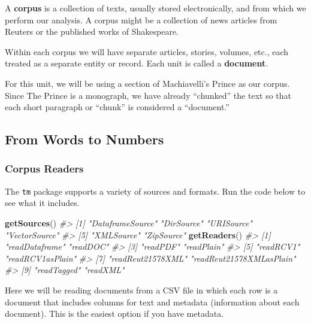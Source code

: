 \documentclass[]{book}
\newenvironment{Shaded}{\begin{snugshade}}{\end{snugshade}}
\newcommand{\KeywordTok}[1]{\textcolor[rgb]{0.13,0.29,0.53}{\textbf{#1}}}
\newcommand{\CommentTok}[1]{\textcolor[rgb]{0.56,0.35,0.01}{\textit{#1}}}
\newcommand{\NormalTok}[1]{#1}
\begin{document}
A \textbf{corpus} is a collection of texts, usually stored
electronically, and from which we perform our analysis. A corpus might
be a collection of news articles from Reuters or the published works of
Shakespeare.

Within each corpus we will have separate articles, stories, volumes,
etc., each treated as a separate entity or record. Each unit is called a
\textbf{document}.

For this unit, we will be using a section of Machiavelli's Prince as our
corpus. Since The Prince is a monograph, we have already ``chunked'' the
text so that each short paragraph or ``chunk'' is considered a
``document.''

\subsection{From Words to Numbers}\label{from-words-to-numbers}

\subsubsection*{Corpus Readers}\label{corpus-readers}

The \texttt{tm} package supports a variety of sources and formats. Run
the code below to see what it includes.

\begin{Shaded}
\begin{Highlighting}[]
\KeywordTok{getSources}\NormalTok{()}
\CommentTok{#> [1] "DataframeSource" "DirSource"       "URISource"       "VectorSource"   }
\CommentTok{#> [5] "XMLSource"       "ZipSource"}
\KeywordTok{getReaders}\NormalTok{()}
\CommentTok{#>  [1] "readDataframe"           "readDOC"                }
\CommentTok{#>  [3] "readPDF"                 "readPlain"              }
\CommentTok{#>  [5] "readRCV1"                "readRCV1asPlain"        }
\CommentTok{#>  [7] "readReut21578XML"        "readReut21578XMLasPlain"}
\CommentTok{#>  [9] "readTagged"              "readXML"}
\end{Highlighting}
\end{Shaded}

Here we will be reading documents from a CSV file in which each row is a
document that includes columns for text and metadata (information about
each document). This is the easiest option if you have metadata.
\end{document}
